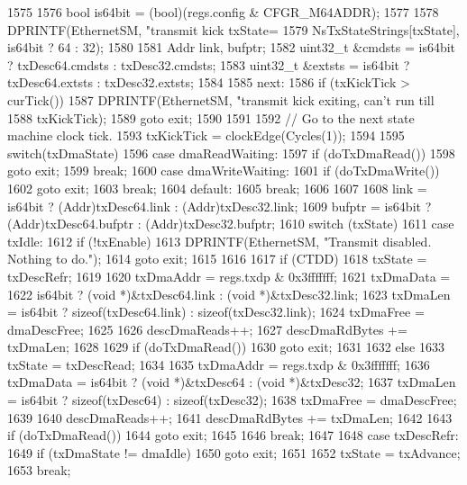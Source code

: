 \begin{DoxyCode}
1575 {
1576     bool is64bit = (bool)(regs.config & CFGR_M64ADDR);
1577 
1578     DPRINTF(EthernetSM, "transmit kick txState=%
1579             NsTxStateStrings[txState], is64bit ? 64 : 32);
1580 
1581     Addr link, bufptr;
1582     uint32_t &cmdsts = is64bit ? txDesc64.cmdsts : txDesc32.cmdsts;
1583     uint32_t &extsts = is64bit ? txDesc64.extsts : txDesc32.extsts;
1584 
1585   next:
1586     if (txKickTick > curTick()) {
1587         DPRINTF(EthernetSM, "transmit kick exiting, can't run till %
1588                 txKickTick);
1589         goto exit;
1590     }
1591 
1592     // Go to the next state machine clock tick.
1593     txKickTick = clockEdge(Cycles(1));
1594 
1595     switch(txDmaState) {
1596       case dmaReadWaiting:
1597         if (doTxDmaRead())
1598             goto exit;
1599         break;
1600       case dmaWriteWaiting:
1601         if (doTxDmaWrite())
1602             goto exit;
1603         break;
1604       default:
1605         break;
1606     }
1607 
1608     link = is64bit ? (Addr)txDesc64.link : (Addr)txDesc32.link;
1609     bufptr = is64bit ? (Addr)txDesc64.bufptr : (Addr)txDesc32.bufptr;
1610     switch (txState) {
1611       case txIdle:
1612         if (!txEnable) {
1613             DPRINTF(EthernetSM, "Transmit disabled.  Nothing to do.\n");
1614             goto exit;
1615         }
1616 
1617         if (CTDD) {
1618             txState = txDescRefr;
1619 
1620             txDmaAddr = regs.txdp & 0x3fffffff;
1621             txDmaData =
1622                 is64bit ? (void *)&txDesc64.link : (void *)&txDesc32.link;
1623             txDmaLen = is64bit ? sizeof(txDesc64.link) : sizeof(txDesc32.link);
1624             txDmaFree = dmaDescFree;
1625 
1626             descDmaReads++;
1627             descDmaRdBytes += txDmaLen;
1628 
1629             if (doTxDmaRead())
1630                 goto exit;
1631 
1632         } else {
1633             txState = txDescRead;
1634 
1635             txDmaAddr = regs.txdp & 0x3fffffff;
1636             txDmaData = is64bit ? (void *)&txDesc64 : (void *)&txDesc32;
1637             txDmaLen = is64bit ? sizeof(txDesc64) : sizeof(txDesc32);
1638             txDmaFree = dmaDescFree;
1639 
1640             descDmaReads++;
1641             descDmaRdBytes += txDmaLen;
1642 
1643             if (doTxDmaRead())
1644                 goto exit;
1645         }
1646         break;
1647 
1648       case txDescRefr:
1649         if (txDmaState != dmaIdle)
1650             goto exit;
1651 
1652         txState = txAdvance;
1653         break;
}}
\end{DoxyCode}
